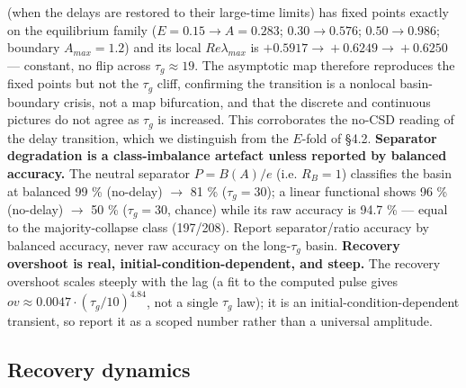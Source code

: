 \documentclass[11pt]{article}
\begin{document}
(when the delays are restored to their large-time limits) has fixed points exactly on the equilibrium family ($E = 0.15 \to{} A = 0.283$; $0.30 \to{} 0.576$; $0.50 \to{} 0.986$; boundary $A_{max} = 1.2$) and its local $Re \lambda{}_{max}$ is $+0.5917 \to{} +0.6249 \to{} +0.6250$ — constant, no flip across $\tau{}_{g} \approx{} 19$. The asymptotic map therefore reproduces the fixed points but not the $\tau{}_{g}$ cliff, confirming the transition is a nonlocal basin-boundary crisis, not a map bifurcation, and that the discrete and continuous pictures do not agree as $\tau{}_{g}$ is increased. This corroborates the no-CSD reading of the delay transition, which we distinguish from the $E$-fold of §4.2. \textbf{Separator degradation is a class-imbalance artefact unless reported by balanced accuracy.} The neutral separator $P = B(A)/e$ (i.e. $R_{B} = 1$) classifies the basin at balanced 99 \% (no-delay) \ensuremath{\to{}} 81 \% ($\tau{}_{g} = 30$); a linear functional shows 96 \% (no-delay) \ensuremath{\to{}} 50 \% ($\tau{}_{g} = 30$, chance) while its raw accuracy is 94.7 \% — equal to the majority-collapse class (197/208). Report separator/ratio accuracy by balanced accuracy, never raw accuracy on the long-$\tau{}_{g}$ basin. \textbf{Recovery overshoot is real, initial-condition-dependent, and steep.} The recovery overshoot scales steeply with the lag (a fit to the computed pulse gives $ov \approx{} 0.0047\cdot{}(\tau{}_{g}/10)^4.84$, not a single $\tau{}_{g}$ law); it is an initial-condition-dependent transient, so report it as a scoped number rather than a universal amplitude.

\subsection{Recovery dynamics}
\end{document}
